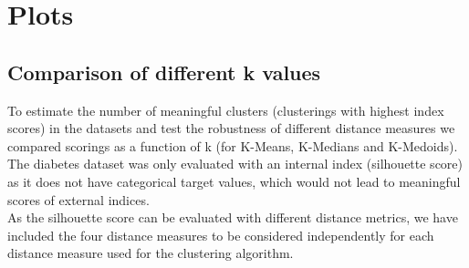 \section{Plots}

\subsection{Comparison of different k values}
To estimate the number of meaningful clusters (clusterings with highest index scores) in the datasets and test the robustness of different distance measures we compared scorings as a function of k (for K-Means, K-Medians and K-Medoids). The diabetes dataset was only evaluated with an internal index (silhouette score) as it does not have categorical target values, which would not lead to meaningful scores of external indices.  \\
As the silhouette score can be evaluated with different distance metrics, we have included the four distance measures to be considered independently for each distance measure used for the clustering algorithm. 

